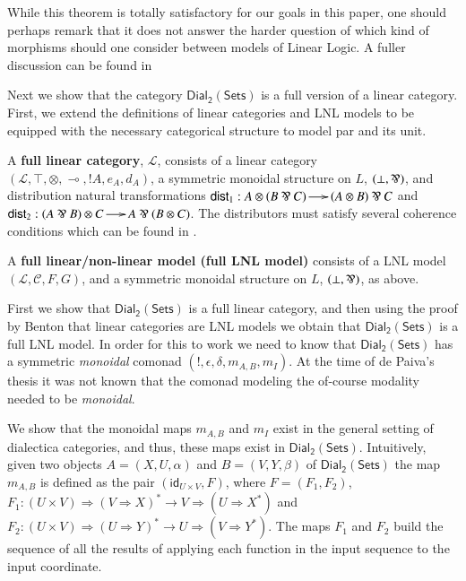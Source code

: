 \documentclass{elsarticle}
\newcommand{\cat}[1]{\mathcal{#1}}
\newcommand{\limp}[0]{\multimap}
\newcommand{\dial}[0]{\mathsf{Dial_2}(\mathsf{Sets})}
\newcommand{\id}[0]{\mathsf{id}}
\begin{document}
While this theorem is totally satisfactory for our goals in this paper, one should perhaps remark that it does not answer the harder question of which kind of morphisms should one consider between models of Linear Logic. A fuller discussion can be found in %
\iffalse
@article{Maietti:2005,
  title={Relating categorical semantics for intuitionistic linear logic},
  author={Maietti, Maria Emilia and Maneggia, Paola and De Paiva, Valeria and Ritter, Eike},
  journal={Applied Categorical Structures},
  volume={13},
  number={1},
  pages={1--36},
  year={2005},
  publisher={Kluwer Academic Publishers}
}
\fi

Next we show that the category $\dial$ is a full version of a linear
category. First, we extend the definitions of linear categories and
LNL models to be equipped with the necessary categorical structure to
model par and its unit.
\begin{definition}
  \label{def:full-linear-cat}
  A \textbf{full linear category}, $\mathcal{L}$, consists of a linear
  category \\$(\mathcal{L}, \top, \otimes, \limp,!A,e_A,d_A)$, a
  symmetric monoidal structure on $L$, $(\perp, \parr)$, and
  distribution natural transformations $\mathsf{dist}_1 : A \otimes (B
  \parr C) \to (A \otimes B) \parr C$ and $\mathsf{dist}_2 : (A \parr
  B) \otimes C \to A \parr (B \otimes C)$.  The distributors must
  satisfy several coherence conditions which can  be found in
  \cite{Cockett:1997}.
\end{definition}
\begin{definition}
  \label{def:full-lnl-model}
  A \textbf{full linear/non-linear model (full LNL model)} consists of
  a LNL model $(\cat{L}, \cat{C},F,G)$, and a symmetric monoidal
  structure on $L$, $(\perp, \parr)$, as above.
\end{definition}

\noindent
First we show that $\dial$ is a full linear category, and then using
the proof by Benton that linear categories are LNL models we obtain
that $\dial$ is a full LNL model. In order for this to work we
need to know that $\dial$ has a symmetric \textit{monoidal} comonad $(!,
\epsilon, \delta, m_{A,B}, m_I)$.  At the time of de Paiva's
thesis it was not known that the comonad modeling the of-course
modality needed to be \textit{monoidal}.  

We  show that the  monoidal maps
$m_{A,B}$ and $m_I$ exist in the  general setting of dialectica
categories, and thus, these maps exist in $\dial$. 
Intuitively, given
two objects $A = (X,U,\alpha)$ and $B = (V,Y,\beta)$ of $\dial$ the
map $m_{A,B}$ is defined as the pair $(\id_{U \times V},F)$, where $F
= (F_1,F_2)$, $F_1 : (U \times V) \Rightarrow (V \Rightarrow X)^* \to
V \Rightarrow (U \Rightarrow X^*)$ and $F_2 : (U \times V) \Rightarrow
(U \Rightarrow Y)^* \to U \Rightarrow (V \Rightarrow Y^*)$.  The maps
$F_1$ and $F_2$ build the sequence of all the results of applying each
function in the input sequence to the input coordinate.
\end{document}
